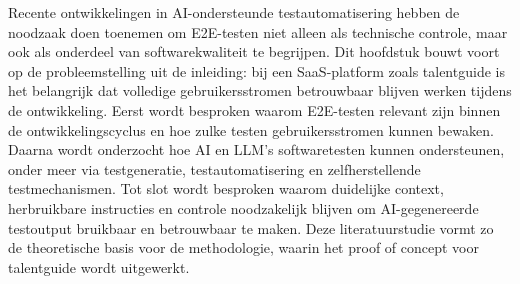 




Recente ontwikkelingen in AI-ondersteunde testautomatisering hebben de noodzaak doen toenemen om E2E-testen niet alleen als technische controle, maar ook als onderdeel van softwarekwaliteit te begrijpen. Dit hoofdstuk bouwt voort op de probleemstelling uit de inleiding: bij een SaaS-platform zoals talentguide is het belangrijk dat volledige gebruikersstromen betrouwbaar blijven werken tijdens de ontwikkeling. Eerst wordt besproken waarom E2E-testen relevant zijn binnen de ontwikkelingscyclus en hoe zulke testen gebruikersstromen kunnen bewaken. Daarna wordt onderzocht hoe AI en LLM's softwaretesten kunnen ondersteunen, onder meer via testgeneratie, testautomatisering en zelfherstellende testmechanismen. Tot slot wordt besproken waarom duidelijke context, herbruikbare instructies en controle noodzakelijk blijven om AI-gegenereerde testoutput bruikbaar en betrouwbaar te maken. Deze literatuurstudie vormt zo de theoretische basis voor de methodologie, waarin het proof of concept voor talentguide wordt uitgewerkt.

